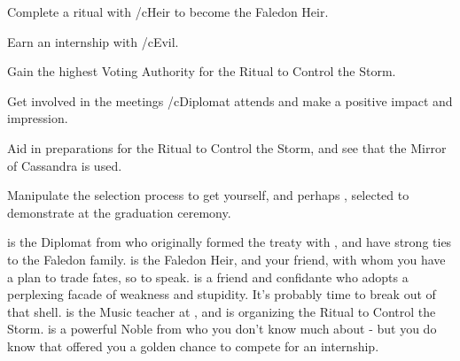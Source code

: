 \documentclass[char]{GL2020}
\begin{document}
\begin{itemz}[Goals]
	\item Complete a ritual with /cHeir{} to become the Faledon Heir.
	\item Earn an internship with /cEvil{}.
\item Gain the highest Voting Authority for the Ritual to Control the Storm.
\item Get involved in the meetings /cDiplomat{} attends and make a positive impact and impression.
\item Aid in preparations for the Ritual to Control the Storm, and see that the Mirror of Cassandra is used.
\item Manipulate the selection process to get yourself, and perhaps \cChupStudent{}, selected to demonstrate at the graduation ceremony.
\end{itemz}

\begin{itemz}[Notes]
	\item 
\end{itemz}

\begin{contacts}
	\contact{\cDiplomat{}} is the Diplomat from \pTech{} who originally formed the treaty with \pFarm{}, and \cDiplomat{\they} have strong ties to the Faledon family.
	\contact{\cHeir{}} is the Faledon Heir, and your friend, with whom you have a plan to trade fates, so to speak.
	\contact{\cChupStudent{}} is a friend and confidante who adopts a perplexing facade of weakness and stupidity. It’s probably time to break \cChupStudent{\them} out of that shell.
	\contact{\cMusic{}} is the Music teacher at \pSchool{}, and is organizing the Ritual to Control the Storm.
	\contact{\cEvil{}} is a powerful Noble from \pFarm{} who you don’t know much about - but you do know that \cEvil{\they} \cEvil{\have} offered you a golden chance to compete for an internship.
\end{contacts}
\end{document}
